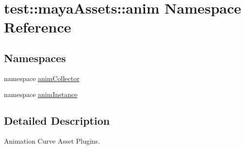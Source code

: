 \hypertarget{namespacetest_1_1mayaAssets_1_1anim}{\section{test\-:\-:maya\-Assets\-:\-:anim \-Namespace \-Reference}
\label{d4/d19/namespacetest_1_1mayaAssets_1_1anim}
}
\subsection*{\-Namespaces}
\begin{DoxyCompactItemize}
\item 
namespace \hyperlink{namespacetest_1_1mayaAssets_1_1anim_1_1animCollector}{anim\-Collector}
\item 
namespace \hyperlink{namespacetest_1_1mayaAssets_1_1anim_1_1animInstance}{anim\-Instance}
\end{DoxyCompactItemize}


\subsection{\-Detailed \-Description}
\begin{DoxyVerb}
Animation Curve Asset Plugins.
\end{DoxyVerb}
 